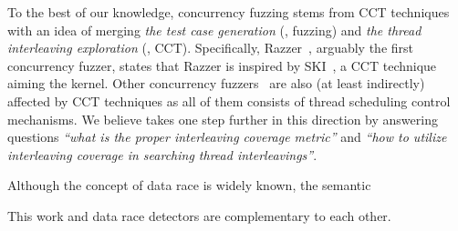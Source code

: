 To the best of our knowledge, concurrency fuzzing stems from CCT
techniques with an idea of merging \textit{the test case generation}
(\ie, fuzzing) and \textit{the thread interleaving exploration} (\ie,
CCT).
%
Specifically, Razzer~\cite{razzer}, arguably the first concurrency
fuzzer, states that Razzer is inspired by SKI~\cite{ski}, a CCT
technique aiming the kernel.
%
Other concurrency fuzzers~\cite{krace, muzz, snowboard, conzzer} are
also (at least indirectly) affected by CCT techniques as all of them
consists of thread scheduling control mechanisms.
%
We believe \sys takes one step further in this direction by answering
questions \textit{``what is the proper interleaving coverage metric''}
and \textit{``how to utilize interleaving coverage in searching thread
  interleavings''}.



%

\cite{lkmm, linuxmemorymodel}

Although the concept of data race is widely known, the semantic

This work and data race detectors are complementary to each other.
%




